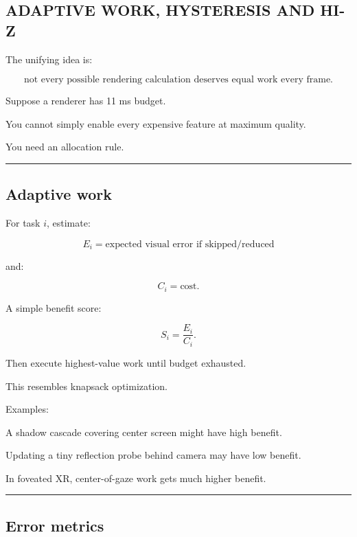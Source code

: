 \subsection{ADAPTIVE WORK, HYSTERESIS AND HI-Z}\label{04-visual-computing-ii-ch040-adaptive-work-hysteresis-and-hi-z}

The unifying idea is:

\[
\boxed{
\text{not every possible rendering calculation deserves equal work every frame}.
}
\]

Suppose a renderer has 11 ms budget.

You cannot simply enable every expensive feature at maximum quality.

You need an allocation rule.

\begin{center}\rule{0.5\linewidth}{0.5pt}\end{center}

\subsection{Adaptive work}\label{04-visual-computing-ii-ch040-adaptive-work}

For task \(i\), estimate:

\[
E_i=
\text{expected visual error if skipped/reduced}
\]

and:

\[
C_i=
\text{cost}.
\]

A simple benefit score:

\[
\boxed{
S_i=
\frac{E_i}{C_i}.
}
\]

Then execute highest-value work until budget exhausted.

This resembles knapsack optimization.

Examples:

A shadow cascade covering center screen might have high benefit.

Updating a tiny reflection probe behind camera may have low benefit.

In foveated XR, center-of-gaze work gets much higher benefit.

\begin{center}\rule{0.5\linewidth}{0.5pt}\end{center}

\subsection{Error metrics}\label{04-visual-computing-ii-ch040-error-metrics}

